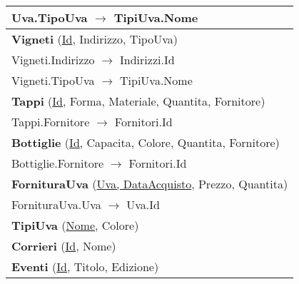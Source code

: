 \begin{center}
\begin{minipage}[t]{7.5cm}
{\begin{tabular}{P{7.5cm}}
				\midrule
				Uva.TipoUva $\to$ TipiUva.Nome                                                                                                                                                                                         \\
				\midrule
				 \textbf{Vigneti} (\underline{Id}, Indirizzo, TipoUva)                      \\
				\midrule
				Vigneti.Indirizzo $\to$ Indirizzi.Id                                                                        \\
				\midrule
				Vigneti.TipoUva $\to$ TipiUva.Nome                                                                          \\                                
				\midrule
				 \textbf{Tappi} (\underline{Id}, Forma, Materiale, Quantita, Fornitore)     \\
				\midrule
				Tappi.Fornitore $\to$ Fornitori.Id                                                                          \\                                
				\midrule
				 \textbf{Bottiglie} (\underline{Id}, Capacita, Colore, Quantita, Fornitore) \\
				\midrule
				Bottiglie.Fornitore $\to$ Fornitori.Id                                                                      \\                                
				\midrule
				 \textbf{FornituraUva} (\underline{Uva, DataAcquisto}, Prezzo, Quantita)    \\
				\midrule
				FornituraUva.Uva $\to$ Uva.Id                                                                               \\                                
				\midrule
				 \textbf{TipiUva} (\underline{Nome}, Colore)                                                                           \\                                
				\midrule
				 \textbf{Corrieri} (\underline{Id}, Nome)                                                                              \\                                
				\midrule
				 \textbf{Eventi} (\underline{Id}, Titolo, Edizione)                                                                    \\

\end{tabular}}
\end{minipage}
\end{center}
